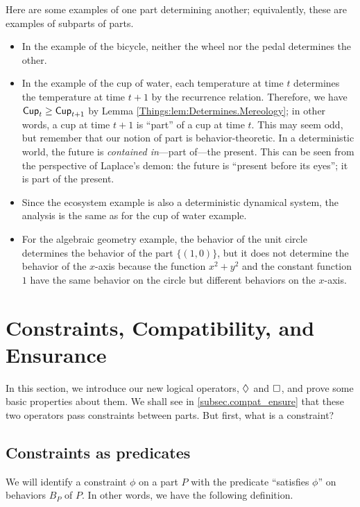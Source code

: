 \begin{ex}
Here are some examples of one part determining another; equivalently, these are examples of subparts of parts.
\begin{itemize}
    \item In the example of the bicycle, neither the wheel nor the pedal determines the other.
    \item In the example of the cup of water, each temperature at time $t$ determines the temperature at time $t + 1$ by the recurrence relation. Therefore, we have $\mathsf{{Cup}}_t \geq \mathsf{{Cup}}_{t + 1}$ by Lemma \ref{Things:lem:Determines.Mereology}; in other words, a cup at time $t + 1$ is ``part'' of a cup at time $t$. This may seem odd, but remember that our notion of part is behavior-theoretic. In a deterministic world, the future is \emph{contained in}---part of---the present. This can be seen from the perspective of Laplace's demon: the future is ``present before its eyes''; it is part of the present.
    \item Since the ecosystem example is also a deterministic dynamical system, the analysis is the same as for the cup of water example.
    \item For the algebraic geometry example, the behavior of the unit circle determines the behavior of the part $\{(1,0)\}$, but it does not determine the behavior of the $x$-axis because the function $x^2+y^2$ and the constant function $1$ have the same behavior on the circle but different behaviors on the $x$-axis.
\end{itemize}
\end{ex}


\section{Constraints, Compatibility, and Ensurance}

In this section, we introduce our new logical operators, $\Diamond_{}^{}$ and $\Box_{}^{}$, and prove some basic properties about them. We shall see in \cref{subsec.compat_ensure} that these two operators pass constraints between parts. But first, what is a constraint?

\subsection{Constraints as predicates}
We will identify a constraint $\phi$ on a part $P$ with the predicate ``satisfies $\phi$'' on behaviors $B_P$ of $P$. In other words, we have the following definition.

